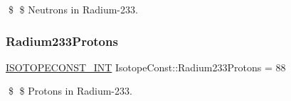 \$ \$ Neutrons in Radium-\/233. \mbox{\label{group___isotope_const-_radium-_ra233_gad354ba8060df0799c999aa4ee35b2062}} 
\subsubsection{\texorpdfstring{Radium233\+Protons}{Radium233Protons}}
{\footnotesize\ttfamily \mbox{\hyperlink{group___isotope_const-_macros_ga5f18360b3e99483a35c32d789e62621c}{I\+S\+O\+T\+O\+P\+E\+C\+O\+N\+S\+T\+\_\+\+I\+NT}} Isotope\+Const\+::\+Radium233\+Protons = 88}

\$ \$ Protons in Radium-\/233. 
